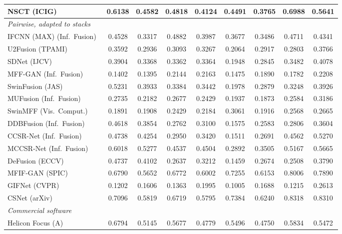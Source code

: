 \begin{table}[H]
{\begin{tabular}{lcccccccc}
NSCT (ICIG)~\cite{yang2007image} & 0.6138 & 0.4582 & 0.4818 & 0.4124 & 0.4491 & 0.3765 & 0.6988 & 0.5641 \\
\midrule
\multicolumn{9}{l}{\textit{Pairwise, adapted to stacks}} \\
IFCNN (MAX) (Inf.\ Fusion)~\cite{zhang2020ifcnn} & 0.4528 & 0.3317 & 0.4882 & 0.3987 & 0.3677 & 0.3486 & 0.4711 & 0.4341 \\
U2Fusion (TPAMI)~\cite{xu2020u2fusion} & 0.3592 & 0.2936 & 0.3093 & 0.3267 & 0.2064 & 0.2917 & 0.2803 & 0.3766 \\
SDNet (IJCV)~\cite{zhang2021sdnet} & 0.3904 & 0.3368 & 0.3362 & 0.3364 & 0.1948 & 0.2845 & 0.3482 & 0.4078 \\
MFF-GAN (Inf.\ Fusion)~\cite{zhang2021mff} & 0.1402 & 0.1395 & 0.2144 & 0.2163 & 0.1475 & 0.1890 & 0.1782 & 0.2208 \\
SwinFusion (JAS)~\cite{ma2022swinfusion} & 0.5231 & 0.3933 & 0.3384 & 0.3442 & 0.1978 & 0.2879 & 0.3248 & 0.3926 \\
MUFusion (Inf.\ Fusion)~\cite{cheng2023mufusion} & 0.2735 & 0.2182 & 0.2677 & 0.2429 & 0.1937 & 0.1873 & 0.2584 & 0.3186 \\
SwinMFF (Vis.\ Comput.)~\cite{xie2024swinmff} & 0.1891 & 0.1908 & 0.2429 & 0.2184 & 0.3061 & 0.1916 & 0.2568 & 0.2665 \\
DDBFusion (Inf.\ Fusion)~\cite{zhang2025ddbfusion} & 0.4618 & 0.3854 & 0.2762 & 0.3100 & 0.1575 & 0.2583 & 0.2806 & 0.3604 \\
CCSR-Net (Inf.\ Fusion)~\cite{ZHENG2025102974} & 0.4738 & 0.4254 & 0.2950 & 0.3420 & 0.1511 & 0.2691 & 0.4562 & 0.5270 \\
MCCSR-Net (Inf.\ Fusion)~\cite{ZHENG2025102974} & 0.6018 & 0.5277 & 0.4537 & 0.4504 & 0.2892 & 0.3505 & 0.5167 & 0.5665 \\
DeFusion (ECCV)~\cite{liang2022defusion} & 0.4737 & 0.4102 & 0.2637 & 0.3212 & 0.1459 & 0.2674 & 0.2508 & 0.3790 \\
MFIF-GAN (SPIC)~\cite{wang2021mfifgan} & 0.6790 & 0.5652 & 0.6772 & 0.6002 & 0.7255 & 0.6153 & 0.8006 & 0.7890 \\
GIFNet (CVPR)~\cite{cheng2025gifnet} & 0.1202 & 0.1606 & 0.1363 & 0.1995 & 0.1005 & 0.1688 & 0.1215 & 0.2613 \\
CSNet (arXiv)~\cite{csnet2026} & 0.7096 & 0.5819 & 0.6719 & 0.5795 & 0.7384 & 0.6240 & 0.8318 & 0.8310 \\
\midrule
\multicolumn{9}{l}{\textit{Commercial software}} \\
Helicon Focus (A) & 0.6794 & 0.5145 & 0.5677 & 0.4779 & 0.5496 & 0.4750 & 0.5834 & 0.5472 \\

\end{tabular}}
\end{table}
